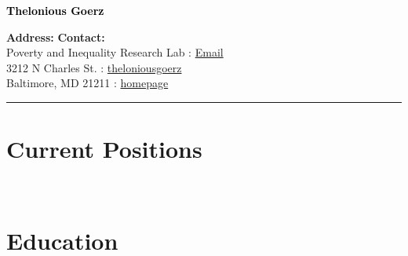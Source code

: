\documentclass[11pt]{article} %
\begin{document}

{\Huge\bfseries \textcolor{black}{Thelonious Goerz}} \\
\bigskip 

\textbf{Address:} \hfill \textbf{Contact:} \\
Poverty and Inequality Research Lab  \hfill {} : \href{mailto:theloniouslgoerz@gmail.com}{Email}\\ %
3212 N Charles St.  \hfill {} : \href{https://github.com/theloniousgoerz/}{theloniousgoerz}\\ %
Baltimore, MD 21211 \hfill {} : \href{theloniousgoerz.github.io}{homepage} \\
\noindent\rule{16cm}{0.4pt}

\vspace{0.001\textheight} %





\section*{Current Positions}

 \\

\section*{Education}

 
\end{document}

